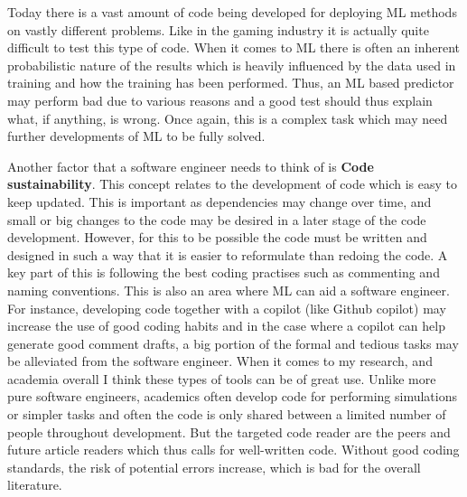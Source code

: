 \documentclass[11pt]{article}
\begin{document}
Today there is a vast amount of code being developed for deploying ML methods on vastly different problems. Like in the gaming industry it is actually quite difficult to test this type of code. When it comes to ML there is often an inherent probabilistic nature of the results which is heavily influenced by the data used in training and how the training has been performed. Thus, an ML based predictor may perform bad due to various reasons and a good test should thus explain what, if anything, is wrong. Once again, this is a complex task which may need further developments of ML to be fully solved.

Another factor that a software engineer needs to think of is \textbf{Code sustainability}. This concept relates to the development of code which is easy to keep updated. This is important as dependencies may change over time, and small or big changes to the code may be desired in a later stage of the code development. However, for this to be possible the code must be written and designed in such a way that it is easier to reformulate than redoing the code. A key part of this is following the best coding practises such as commenting and naming conventions. This is also an area where ML can aid a software engineer. For instance, developing code together with a copilot (like Github copilot) may increase the use of good coding habits and in the case where a copilot can help generate good comment drafts, a big portion of the formal and tedious tasks may be alleviated from the software engineer. When it comes to my research, and academia overall I think these types of tools can be of great use. Unlike more pure software engineers, academics often develop code for performing simulations or simpler tasks and often the code is only shared between a limited number of people throughout development. But the targeted code reader are the peers and future article readers which thus calls for well-written code. Without good coding standards, the risk of potential errors increase, which is bad for the overall literature.  
\end{document}

